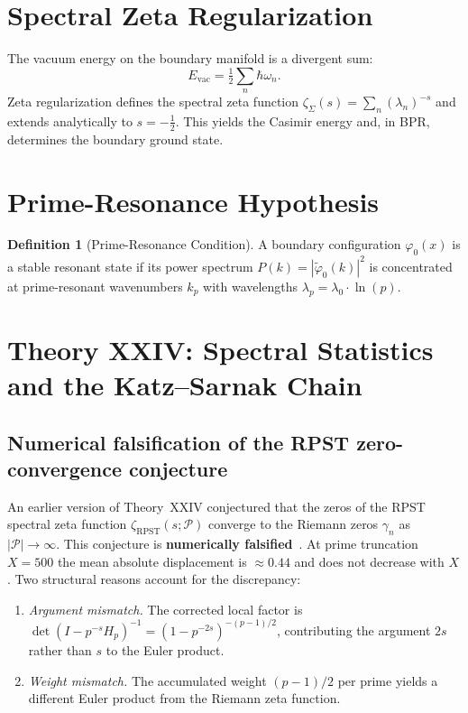 \documentclass[12pt,oneside]{book}
\theoremstyle{definition}
\newtheorem{definition}{Definition}[chapter]
\begin{document}
\section{Spectral Zeta Regularization}

The vacuum energy on the boundary manifold is a divergent sum:
\begin{equation}
  E_{\mathrm{vac}} = \tfrac{1}{2}\sum_n\hbar\omega_n.
\end{equation}
Zeta regularization defines the spectral zeta function
$\zeta_\Sigma(s) = \sum_n (\lambda_n)^{-s}$ and extends analytically to
$s = -\tfrac{1}{2}$. This yields the Casimir energy and, in BPR, determines the
boundary ground state.

\section{Prime-Resonance Hypothesis}

\begin{definition}[Prime-Resonance Condition]
  A boundary configuration $\varphi_0(x)$ is a stable resonant state if its
  power spectrum $P(k) = |\tilde{\varphi}_0(k)|^2$ is concentrated at
  prime-resonant wavenumbers $k_p$ with wavelengths
  $\lambda_p = \lambda_0 \cdot \ln(p)$.
\end{definition}

\section{Theory XXIV: Spectral Statistics and the Katz--Sarnak Chain}

\subsection{Numerical falsification of the RPST zero-convergence conjecture}

An earlier version of Theory~XXIV conjectured that the zeros of the RPST
spectral zeta function $\zeta_{\mathrm{RPST}}(s; \mathcal{P})$ converge to the
Riemann zeros $\gamma_n$ as $|\mathcal{P}| \to \infty$.
This conjecture is \textbf{numerically falsified}~\cite{AlKahwati2026Numerical}.
At prime truncation $X = 500$ the mean absolute displacement is $\approx 0.44$
and does not decrease with $X$.  Two structural reasons account for the
discrepancy:

\begin{enumerate}
\item \emph{Argument mismatch.} The corrected local factor is
  $\det(I - p^{-s}H_p)^{-1} = (1 - p^{-2s})^{-(p-1)/2}$, contributing
  the argument $2s$ rather than $s$ to the Euler product.

\item \emph{Weight mismatch.} The accumulated weight $(p-1)/2$ per prime
  yields a different Euler product from the Riemann zeta function.
\end{enumerate}
\end{document}
